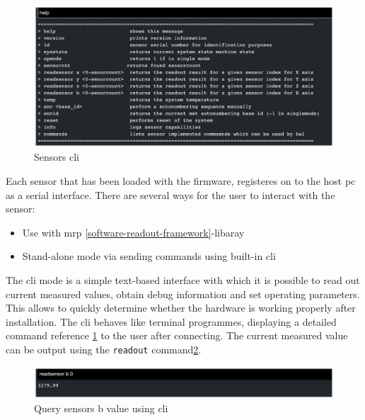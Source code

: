 \begin{figure}
\centering
\includegraphics{./generated_images/border_Sensors_(+cli).png}
\caption{Sensors \gls{cli} \label{Sensors_(+cli).png}}
\end{figure}

Each sensor that has been loaded with the firmware, registeres on to the
host \gls{pc} as a serial interface. There are several ways for the user
to interact with the sensor:

\begin{itemize}
\tightlist
\item
  Use with \gls{mrp} \ref{software-readout-framework}-libaray
\item
  Stand-alone mode via sending commands using built-in \gls{cli}
\end{itemize}

The \gls{cli} mode is a simple text-based interface with which it is
possible to read out current measured values, obtain debug information
and set operating parameters. This allows to quickly determine whether
the hardware is working properly after installation. The \gls{cli}
behaves like terminal programmes, displaying a detailed command
reference \ref{Sensors_(+cli).png} to the user after connecting. The
current measured value can be output using the
\passthrough{\lstinline!readout!}
command\ref{Query_sensors_b_value_using_(+cli).png}.

\begin{figure}
\centering
\includegraphics{./generated_images/border_Query_sensors_b_value_using_(+cli).png}
\caption{Query sensors b value using \gls{cli}
\label{Query_sensors_b_value_using_(+cli).png}}
\end{figure}

